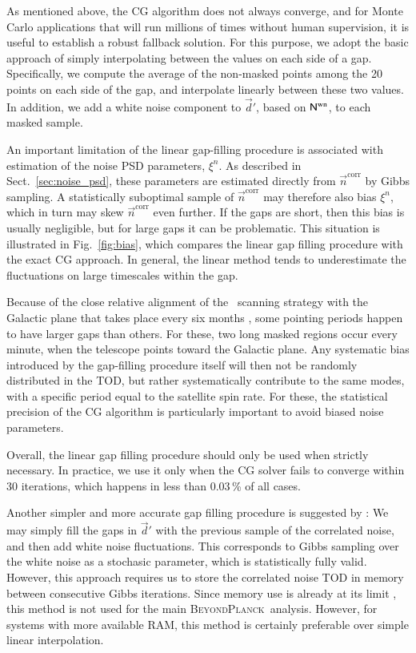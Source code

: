 \documentclass[twocolumn]{aa}
\renewcommand{\d}[0]{\vec{d}}
\newcommand{\N}[0]{\tens{N}}
\newcommand{\BP}{\textsc{BeyondPlanck}}
\begin{document}
As mentioned above, the CG algorithm does not always converge, and for
Monte Carlo applications that will run millions of times without human
supervision, it is useful to establish a robust fallback solution. For
this purpose, we adopt the basic approach of simply interpolating
between the values on each side of a gap. Specifically, we compute the
average of the non-masked points among the 20 points on each side of
the gap, and interpolate linearly between these two values. In
addition, we add a white noise component to $\vec{d}'$, based on
$\N^{\mathrm{wn}}$, to each masked sample.

An important limitation of the linear gap-filling procedure is
associated with estimation of the noise PSD parameters, $\xi^n$. As
described in Sect.~\ref{sec:noise_psd}, these parameters are estimated
directly from $\vec{n}^\mathrm{corr}$ by Gibbs sampling. A
statistically suboptimal sample of $\vec{n}^\mathrm{corr}$ may
therefore also bias $\xi^n$, which in turn may skew
$\vec{n}^\mathrm{corr}$ even further. If the gaps are short, then this
bias is usually negligible, but for large gaps it can be
problematic. This situation is illustrated in Fig.~\ref{fig:bias},
which compares the linear gap filling procedure with the exact CG
approach. In general, the linear method tends to underestimate the
fluctuations on large timescales within the gap.

Because of the close relative alignment of the \Planck\ scanning
strategy with the Galactic plane that takes place every six
months \citep{planck2011-1.1}, some pointing periods happen to have larger gaps than
others. For these, two long masked regions occur every minute, when
the telescope points toward the Galactic plane. Any systematic bias
introduced by the gap-filling procedure itself will then not be
randomly distributed in the TOD, but rather systematically contribute
to the same modes, with a specific period equal to the satellite spin
rate. For these, the statistical precision of the CG algorithm is
particularly important to avoid biased noise parameters.

Overall, the linear gap filling procedure should only be used when
strictly necessary. In practice, we use it only when the CG solver
fails to converge within 30 iterations, which happens in less
than 0.03\,\% of all cases.

Another simpler and more accurate gap filling procedure is suggested
by \citet{bp02}: We may simply fill the gaps in $\d'$ with the
previous sample of the correlated noise, and then add white noise
fluctuations.  This corresponds to Gibbs sampling over the white noise
as a stochasic parameter, which is statistically fully valid. However,
this approach requires us to store the correlated noise TOD in memory
between consecutive Gibbs iterations. Since memory use is already at
its limit \citep{bp05}, this method is not used for the main
\BP\ analysis. However, for systems with more available RAM, this
method is certainly preferable over simple linear interpolation.
\end{document}
